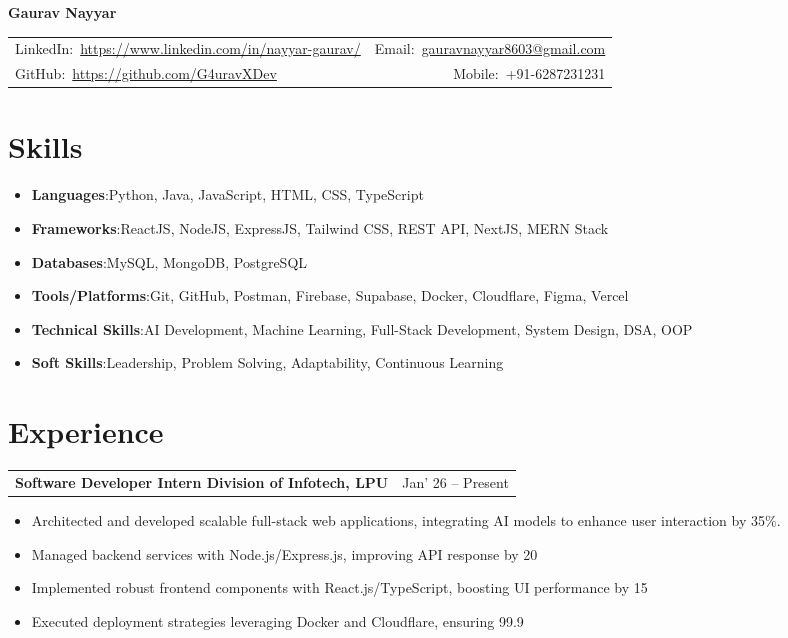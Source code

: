 \documentclass[10pt, a4paper]{article}
\makeatletter
\newcommand{\entryrow}[2]{%
  \noindent\begin{tabularx}{\linewidth}{@{}X@{\hspace{4pt}}r@{}}
    {\color{headingblue}\bfseries\fontsize{8.5pt}{10pt}\selectfont #1} &
    {\fontsize{8.5pt}{10pt}\selectfont #2}
  \end{tabularx}\par\vspace{1pt}%
}
\makeatother
\begin{document}
{\color{headingblue}\bfseries\fontsize{18pt}{22pt}\selectfont Gaurav Nayyar}\par
\vspace{3pt}
\begin{tabularx}{\linewidth}{@{}X@{}r@{}}
  {\fontsize{8.5pt}{10pt}\selectfont LinkedIn:~\href{https://www.linkedin.com/in/nayyar-gaurav/}{https://www.linkedin.com/in/nayyar-gaurav/}} &
  {\fontsize{8.5pt}{10pt}\selectfont Email:~\href{mailto:gauravnayyar8603@gmail.com}{gauravnayyar8603@gmail.com}} \\[1pt]
  {\fontsize{8.5pt}{10pt}\selectfont GitHub:~\href{https://github.com/G4uravXDev}{https://github.com/G4uravXDev}} &
  {\fontsize{8.5pt}{10pt}\selectfont Mobile:~+91-6287231231}
\end{tabularx}

\section{Skills}
\begin{itemize}
  \item {\color{headingblue}\bfseries Languages}:\enspace Python, Java, JavaScript, HTML, CSS, TypeScript
  \item {\color{headingblue}\bfseries Frameworks}:\enspace ReactJS, NodeJS, ExpressJS, Tailwind CSS, REST API, NextJS, MERN Stack
  \item {\color{headingblue}\bfseries Databases}:\enspace MySQL, MongoDB, PostgreSQL
  \item {\color{headingblue}\bfseries Tools/Platforms}:\enspace Git, GitHub, Postman, Firebase, Supabase, Docker, Cloudflare, Figma, Vercel
  \item {\color{headingblue}\bfseries Technical Skills}:\enspace AI Development, Machine Learning, Full-Stack Development, System Design, DSA, OOP
  \item {\color{headingblue}\bfseries Soft Skills}:\enspace Leadership, Problem Solving, Adaptability, Continuous Learning
\end{itemize}

\section{Experience}

\entryrow{Software Developer Intern \textbar{} Division of Infotech, LPU}{Jan' 26 -- Present}
\begin{itemize}
  \item Architected and developed scalable full-stack web applications, integrating AI models to enhance user interaction by 35\%.
  \item Managed backend services with Node.js/Express.js, improving API response by 20%
  \item Implemented robust frontend components with React.js/TypeScript, boosting UI performance by 15%
  \item Executed deployment strategies leveraging Docker and Cloudflare, ensuring 99.9%
\end{itemize}
\end{document}
